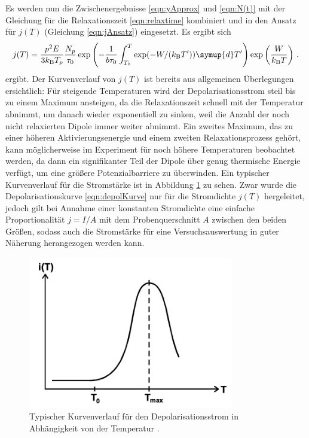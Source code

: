 Es werden nun die Zwischenergebnisse \eqref{eqn:yApprox} und \eqref{eqn:N(t)} mit der Gleichung für die Relaxationszeit \eqref{eqn:relaxtime} kombiniert und in den Ansatz für $j(T)$ (Gleichung \eqref{eqn:jAnsatz}) eingesetzt. Es ergibt sich
\begin{equation}
  j(T) = \frac{p^2 E}{3 k_\text{B} T_p} \frac{N_p}{\tau_0}
         \exp \left(- \frac{1}{b \tau_0} \int_{T_0}^{T} \exp(-W/(k_\text{B}T')) \symup{d}T' \right) \exp\left(\frac{W}{k_{\text{B}}T}\right)\,.
  \label{eqn:depolKurve}
\end{equation}
ergibt. Der Kurvenverlauf von $j(T)$ ist bereits aus allgemeinen Überlegungen ersichtlich: Für steigende Temperaturen wird der Depolarisationsstrom steil bis zu einem Maximum ansteigen, da die Relaxationszeit schnell mit der Temperatur abnimmt, um danach wieder exponentiell zu sinken, weil die Anzahl der noch nicht relaxierten Dipole immer weiter abnimmt. Ein zweites Maximum, das zu einer höheren Aktivierungsenergie und einem zweiten Relaxationsprozess gehört, kann möglicherweise im Experiment für noch höhere Temperaturen beobachtet werden, da dann ein signifikanter Teil der Dipole über genug thermische Energie verfügt, um eine größere Potenzialbarriere zu überwinden.
Ein typischer Kurvenverlauf für die Stromstärke ist in Abbildung \ref{fig:kurve} zu sehen. Zwar wurde die Depolarisationskurve \eqref{eqn:depolKurve} nur für die Stromdichte $j(T)$ hergeleitet, jedoch gilt bei Annahme einer konstanten Stromdichte eine einfache Proportionalität $j=I/A$ mit dem Probenquerschnitt $A$ zwischen den beiden Größen, sodass auch die Stromstärke für eine Versuchsauswertung in guter Näherung herangezogen werden kann.

\begin{figure}
  \centering
  \includegraphics[width=0.8\textwidth]{data/kurve.png}
  \caption{Typischer Kurvenverlauf für den Depolarisationsstrom in Abhängigkeit von der Temperatur \cite{anleitungalt}.}
  \label{fig:kurve}
\end{figure}

